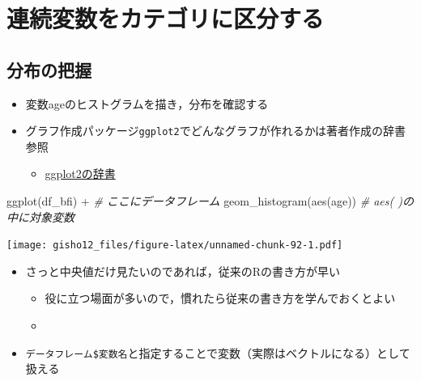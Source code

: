 \documentclass[
  xelatex,ja=standard, b5paper]{bxjsbook}
\newenvironment{Shaded}{\begin{snugshade}}{\end{snugshade}}
\newcommand{\CommentTok}[1]{\textcolor[rgb]{0.56,0.35,0.01}{\textit{#1}}}
\newcommand{\FunctionTok}[1]{\textcolor[rgb]{0.00,0.00,0.00}{#1}}
\newcommand{\NormalTok}[1]{#1}
\newcommand{\SpecialCharTok}[1]{\textcolor[rgb]{0.00,0.00,0.00}{#1}}
\providecommand{\tightlist}{%
  \setlength{\itemsep}{0pt}\setlength{\parskip}{0pt}}
\begin{document}
\hypertarget{ux9023ux7d9aux5909ux6570ux3092ux30abux30c6ux30b4ux30eaux306bux533aux5206ux3059ux308b}{%
\section{連続変数をカテゴリに区分する}\label{ux9023ux7d9aux5909ux6570ux3092ux30abux30c6ux30b4ux30eaux306bux533aux5206ux3059ux308b}}

\hypertarget{ux5206ux5e03ux306eux628aux63e1}{%
\subsection{分布の把握}\label{ux5206ux5e03ux306eux628aux63e1}}

\begin{itemize}
\tightlist
\item
  変数ageのヒストグラムを描き，分布を確認する
\item
  グラフ作成パッケージ\texttt{ggplot2}でどんなグラフが作れるかは著者作成の辞書参照

  \begin{itemize}
  \tightlist
  \item
    \href{https://izunyan.github.io/practice_ggplot2/}{ggplot2の辞書}
  \end{itemize}
\end{itemize}

\begin{Shaded}
\begin{Highlighting}[]
\FunctionTok{ggplot}\NormalTok{(df\_bfi) }\SpecialCharTok{+}           \CommentTok{\# ここにデータフレーム}
  \FunctionTok{geom\_histogram}\NormalTok{(}\FunctionTok{aes}\NormalTok{(age)) }\CommentTok{\# aes( )の中に対象変数}
\end{Highlighting}
\end{Shaded}

\texttt{[image: gisho12\_files/figure-latex/unnamed-chunk-92-1.pdf]}

\begin{itemize}
\tightlist
\item
  さっと中央値だけ見たいのであれば，従来のRの書き方が早い

  \begin{itemize}
  \tightlist
  \item
    役に立つ場面が多いので，慣れたら従来の書き方を学んでおくとよい
  \item
  \end{itemize}
\item
  \texttt{データフレーム\$変数名}と指定することで変数（実際はベクトルになる）として扱える
\end{itemize}
\end{document}
